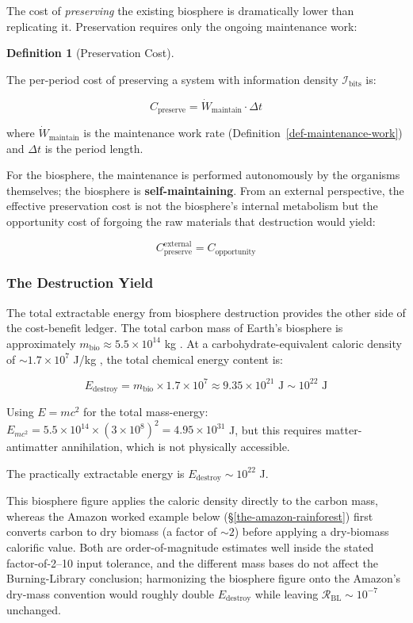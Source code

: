 \documentclass[11pt]{article}
\theoremstyle{plain}
\theoremstyle{definition}
\newtheorem{definition}{Definition}
\theoremstyle{remark}
\let\origsubsubsection\subsubsection
\renewcommand{\subsubsection}{\needspace{4\baselineskip}\origsubsubsection}
\begin{document}
The cost of \emph{preserving} the existing biosphere is dramatically
lower than replicating it. Preservation requires only the ongoing
maintenance work:

\begin{definition}[Preservation Cost]
\label{def-preservation-cost}

The per-period cost of preserving a system with information density $\mathcal{I}_{\text{bits}}$ is:

$$C_{\text{preserve}} = \dot{W}_{\text{maintain}} \cdot \Delta t$$

where $\dot{W}_{\text{maintain}}$ is the maintenance work rate (Definition~\ref{def-maintenance-work}) and $\Delta t$ is the period length.
\end{definition}

For the biosphere, the maintenance is performed autonomously by the
organisms themselves; the biosphere is \textbf{self-maintaining}. From
an external perspective, the effective preservation cost is not the
biosphere's internal metabolism but the opportunity cost of forgoing the
raw materials that destruction would yield:

\[C_{\text{preserve}}^{\text{external}} = C_{\text{opportunity}}\]

\subsubsection{The Destruction Yield}\label{the-destruction-yield}

The total extractable energy from biosphere destruction provides the
other side of the cost-benefit ledger. The total carbon mass of Earth's
biosphere is approximately \(m_{\text{bio}} \approx 5.5 \times 10^{14}\)
kg \citep{BarOn2018}. At a carbohydrate-equivalent caloric density of
\(\sim 1.7 \times 10^7\) J/kg \citep{Smil2002}, the total chemical
energy content is:

\[E_{\text{destroy}} = m_{\text{bio}} \times 1.7 \times 10^7 \approx 9.35 \times 10^{21} \text{ J} \sim 10^{22} \text{ J}\]

Using \(E = mc^2\) for the total mass-energy:
\(E_{mc^2} = 5.5 \times 10^{14} \times (3 \times 10^8)^2 = 4.95 \times 10^{31}\)
J, but this requires matter-antimatter annihilation, which is not
physically accessible.

The practically extractable energy is
\(E_{\text{destroy}} \sim 10^{22}\) J.

This biosphere figure applies the caloric density directly to the carbon
mass, whereas the Amazon worked example below
(§\ref{the-amazon-rainforest}) first converts carbon to dry biomass (a
factor of \(\sim 2\)) before applying a dry-biomass calorific value.
Both are order-of-magnitude estimates well inside the stated
factor-of-2--10 input tolerance, and the different mass bases do not
affect the Burning-Library conclusion; harmonizing the biosphere figure
onto the Amazon's dry-mass convention would roughly double
\(E_{\text{destroy}}\) while leaving
\(\mathcal{R}_{\text{BL}} \sim 10^{-7}\) unchanged.
\end{document}
